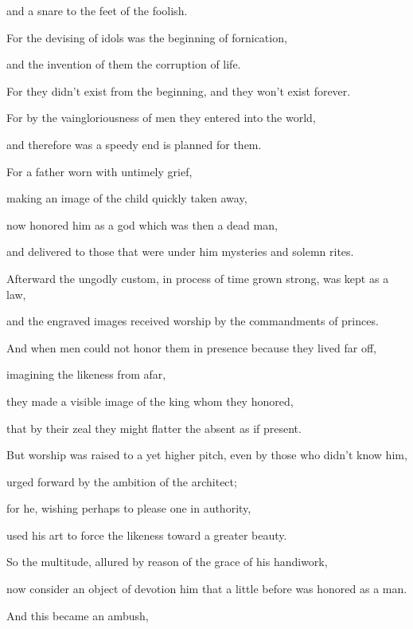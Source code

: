 {\par }{\QB and a snare to the feet of the foolish.
\par }{\BB \par }{\Q {}For the devising of idols was the beginning of fornication,
\par }{\QB and the invention of them the corruption of life.
\par }{\Q {}For they didn’t exist from the beginning, and they won’t exist forever.
\par }{\Q {}For by the vaingloriousness of men they entered into the world,
\par }{\QB and therefore was a speedy end is planned for them.
\par }{\Q {}For a father worn with untimely grief,
\par }{\QB making an image of the child quickly taken away,
\par }{\QB now honored him as a god which was then a dead man,
\par }{\QB and delivered to those that were under him mysteries and solemn rites.
\par }{\Q {}Afterward the ungodly custom, in process of time grown strong, was kept as a law,
\par }{\QB and the engraved images received worship by the commandments of princes.
\par }{\Q {}And when men could not honor them in presence because they lived far off,
\par }{\QB imagining the likeness from afar,
\par }{\QB they made a visible image of the king whom they honored,
\par }{\QB that by their zeal they might flatter the absent as if present.
\par }{\Q {}But worship was raised to a yet higher pitch, even by those who didn’t know him,
\par }{\QB urged forward by the ambition of the architect;
\par }{\Q {}for he, wishing perhaps to please one in authority,
\par }{\QB used his art to force the likeness toward a greater beauty.
\par }{\Q {}So the multitude, allured by reason of the grace of his handiwork,
\par }{\QB now consider an object of devotion him that a little before was honored as a man.
\par }{\Q {}And this became an ambush,
}
